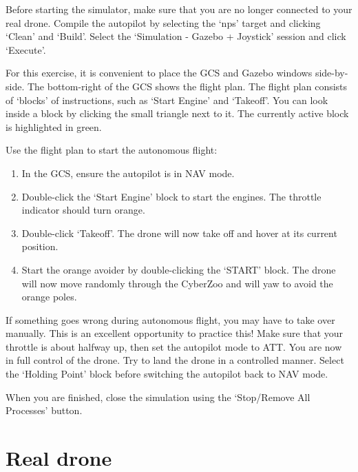 \documentclass{article}
\begin{document}
Before starting the simulator, make sure that you are no longer connected to your real drone.
Compile the autopilot by selecting the `nps' target and clicking `Clean' and `Build'. Select the `Simulation - Gazebo + Joystick' session and click `Execute'.


For this exercise, it is convenient to place the GCS and Gazebo windows side-by-side.
The bottom-right of the GCS shows the flight plan. The flight plan consists of `blocks' of instructions, such as `Start Engine' and `Takeoff'. You can look inside a block by clicking the small triangle next to it. The currently active block is highlighted in green.

Use the flight plan to start the autonomous flight:
\begin{enumerate}
\item In the GCS, ensure the autopilot is in NAV mode.
\item Double-click the `Start Engine' block to start the engines. The throttle indicator should turn orange.
\item Double-click `Takeoff'. The drone will now take off and hover at its current position.
\item Start the orange avoider by double-clicking the `START' block. The drone will now move randomly through the CyberZoo and will yaw to avoid the orange poles.
\end{enumerate}


If something goes wrong during autonomous flight, you may have to take over manually. This is an excellent opportunity to practice this!
Make sure that your throttle is about halfway up, then set the autopilot mode to ATT. You are now in full control of the drone. Try to land the drone in a controlled manner. Select the `Holding Point' block before switching the autopilot back to NAV mode.


When you are finished, close the simulation using the `Stop/Remove All Processes' button.


\section{Real drone}
\end{document}
